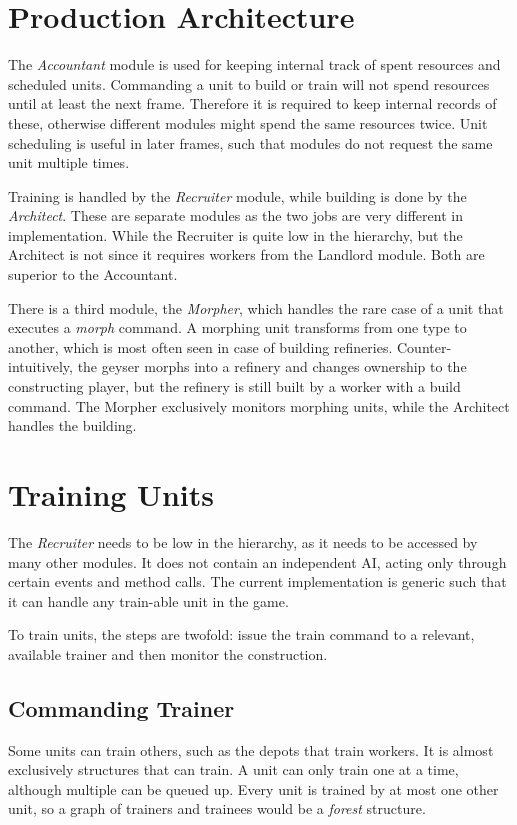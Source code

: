 \section{Production Architecture}
The \emph{Accountant} module is used for keeping internal track of spent resources and scheduled units. Commanding a unit to build or train will not spend resources until at least the next frame. Therefore it is required to keep internal records of these, otherwise different modules might spend the same resources twice. Unit scheduling is useful in later frames, such that modules do not request the same unit multiple times.

Training is handled by the \emph{Recruiter} module, while building is done by the \emph{Architect}. These are separate modules as the two jobs are very different in implementation. While the Recruiter is quite low in the hierarchy, but the Architect is not since it requires workers from the Landlord module. Both are superior to the Accountant.

There is a third module, the \emph{Morpher}, which handles the rare case of a unit that executes a \emph{morph} command. A morphing unit transforms from one type to another, which is most often seen in case of building refineries. Counter-intuitively, the geyser morphs into a refinery and changes ownership to the constructing player, but the refinery is still built by a worker with a build command. The Morpher exclusively monitors morphing units, while the Architect handles the building.

\section{Training Units}
\label{sec:training}
The \emph{Recruiter} needs to be low in the hierarchy, as it needs to be accessed by many other modules. It does not contain an independent AI, acting only through certain events and method calls. The current implementation is generic such that it can handle any train-able unit in the game.

To train units, the steps are twofold: issue the train command to a relevant, available trainer and then monitor the construction.

	\subsection*{Commanding Trainer}
	Some units can train others, such as the depots that train workers. It is almost exclusively structures that can train. A unit can only train one at a time, although multiple can be queued up. Every unit is trained by at most one other unit, so a graph of trainers and trainees would be a \emph{forest} structure.
	
